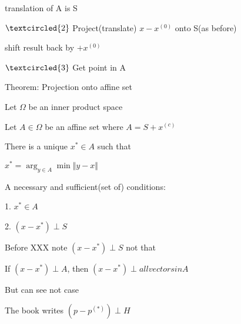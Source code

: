 translation of A is S

$\textcircled{2}$ Project(translate) $x-x^{(0)}$ onto S(as before)

shift result back by $+x^{(0)}$

$\textcircled{3}$ Get point in A

\begin{marginfigure}
	\centering
	\resizebox{7.5cm}{3cm}{}
	\caption{}
	\label{}
\end{marginfigure}

\begin{marginfigure}
	\centering
	\resizebox{7.5cm}{3cm}{}
	\caption{}
	\label{}
\end{marginfigure}

\begin{marginfigure}
	\centering
	\resizebox{7.5cm}{3cm}{}
	\caption{}
	\label{}
\end{marginfigure}

\begin{marginfigure}
	\centering
	\resizebox{7.5cm}{3cm}{}
	\caption{}
	\label{}
\end{marginfigure}


Theorem: Projection onto affine set

Let $\Omega$ be an inner product space

Let $A\in \Omega$ be an affine set where $A=S+x^{(c)}$

There is a unique $x^{*}\in A$ such that

$x^{*} = \arg_{y\in A}\min \Vert y-x\Vert$

A necessary and sufficient(set of) conditions:

1. $x^{*} \in A$

2. $(x-x^{*})\perp S$



Before XXX note $(x-x^{*})\perp S$ not that

If $(x-x^{*})\perp A$, then $(x-x^{*})\perp all vectors in A$

But can see not case

\begin{marginfigure}
	\centering
	\resizebox{7.5cm}{3cm}{}
	\caption{}
	\label{}
\end{marginfigure}

The book writes $(p-p^{(*)})\perp H$



